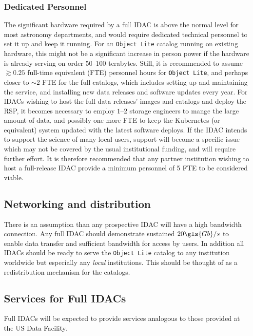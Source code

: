 \subsubsection{Dedicated Personnel}
The significant hardware required by a full  \gls{IDAC} is above the normal level for most astronomy departments, and would require dedicated technical personnel to set it up and keep it running. For an {\tt Object Lite} catalog running on existing hardware, this might not be a significant increase in person power if the hardware is already serving on order $50$--$100$ terabytes. Still, it is recommended to assume $\gtrsim0.25$ full-time equivalent (\gls{FTE}) personnel hours for {\tt Object Lite}, and perhaps closer to $\sim2$ \gls{FTE} for the full catalogs, which includes setting up and maintaining the service, and installing new data releases and software updates every year. For IDACs wishing to host the full data releases' images and catalogs and deploy the \gls{RSP}, it becomes necessary to employ $1$--$2$ storage engineers to mange the large amount of data, and possibly one more \gls{FTE} to keep the \gls{Kubernetes} (or equivalent) system updated with the latest software deploys. If the \gls{IDAC} intends to support the science of many local users, support will become a specific issue which may not be covered by the usual institutional funding, and will require further effort. It is therefore recommended that any partner institution wishing to host a full-release \gls{IDAC} provide a minimum personnel of 5 \gls{FTE} to be considered viable.

\subsection{Networking and distribution}
There is an assumption than any prospective \gls{IDAC} will have a high bandwidth connection.
Any full \gls{IDAC} should  demonstrate sustained $20 \gls{Gb}/s$ to enable data transfer and sufficient bandwidth for access by users.
In addition all IDACs should be ready  to serve the {\tt \gls{Object} Lite} catalog to any institution worldwide but especially any {\em local} institutions. This should be thought of as a redistribution mechanism for the catalogs.

\subsection{Services for Full IDACs}

Full IDACs will be expected to provide services analogous to those provided at the \gls{US} Data Facility.


